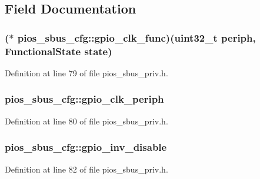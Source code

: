 \subsection{Field Documentation}
\hypertarget{structpios__sbus__cfg_a66cb660c4fe8979c218032c477b12a93}{
\subsubsection[{gpio\-\_\-clk\-\_\-func}]{($\ast$ pios\-\_\-sbus\-\_\-cfg\-::gpio\-\_\-clk\-\_\-func)({\bf uint32\-\_\-t} periph, {\bf Functional\-State} {\bf state})}}\label{structpios__sbus__cfg_a66cb660c4fe8979c218032c477b12a93}


Definition at line 79 of file pios\-\_\-sbus\-\_\-priv.\-h.

\hypertarget{structpios__sbus__cfg_af2100d98daffabe98836f12519330975}{
\subsubsection[{gpio\-\_\-clk\-\_\-periph}]{ pios\-\_\-sbus\-\_\-cfg\-::gpio\-\_\-clk\-\_\-periph}}\label{structpios__sbus__cfg_af2100d98daffabe98836f12519330975}


Definition at line 80 of file pios\-\_\-sbus\-\_\-priv.\-h.

\hypertarget{structpios__sbus__cfg_a843ec7deaae570eeab1dc5770e77dafe}{
\subsubsection[{gpio\-\_\-inv\-\_\-disable}]{ pios\-\_\-sbus\-\_\-cfg\-::gpio\-\_\-inv\-\_\-disable}}\label{structpios__sbus__cfg_a843ec7deaae570eeab1dc5770e77dafe}


Definition at line 82 of file pios\-\_\-sbus\-\_\-priv.\-h.

